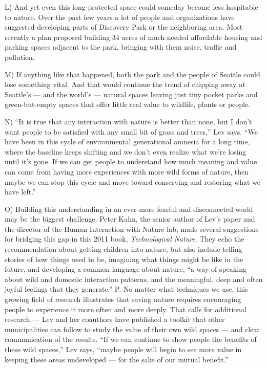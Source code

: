 \documentclass[UTF8,11pt]{ctexart}
\begin{document}
L) And yet even this long-protected space could someday become less hospitable to nature. Over the past few years a lot of people and organizations have suggested developing parts of Discovery Park or the neighboring area. Most recently a plan proposed building 34 acres of much-needed affordable housing and parking spaces adjacent to the park, bringing with them noise, traffic and pollution.


M) If anything like that happened, both the park and the people of Seattle could lose something vital. And that would continue the trend of chipping away at Seattle’s — and the world’s — natural spaces leaving just tiny pocket parks and green-but-empty spaces that offer little real value to wildlife, plants or people.


N) “It is true that any interaction with nature is better than none, but I don’t want people to be satisfied with any small bit of grass and trees,” Lev says. “We have been in this cycle of environmental generational amnesia for a long time, where the baseline keeps shifting and we don’t even realize what we’re losing until it’s gone. If we can get people to understand how much meaning and value can come from having more experiences with more wild forms of nature, then maybe we can stop this cycle and move toward conserving and restoring what we have left.”


O) Building this understanding in an ever-more fearful and disconnected world may be the biggest challenge. Peter Kahn, the senior author of Lev’s paper and the director of the Human Interaction with Nature lab, made several suggestions for bridging this gap in this 2011 book, \textit{Technological} \textit{Nature}. They echo the recommendation about getting children into nature, but also include telling stories of how things used to be, imagining what things might be like in the future, and developing a common language about nature, “a way of speaking about wild and domestic interaction patterns, and the meaningful, deep and often joyful feelings that they generate.” P. No matter what techniques we use, this growing field of research illustrates that saving nature requires encouraging people to experience it more often and more deeply. That calls for additional research — Lev and her coauthors have published a toolkit that other municipalities can follow to study the value of their own wild spaces — and clear communication of the results. “If we can continue to show people the benefits of these wild spaces,” Lev says, “maybe people will begin to see more value in keeping these areas undeveloped — for the sake of our mutual benefit.”
\end{document}
